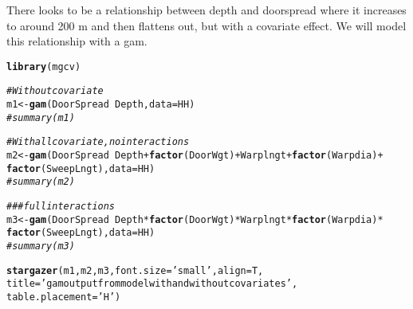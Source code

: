 \documentclass[12pt]{article}\usepackage[]{graphicx}\usepackage[]{color}
\makeatletter
\newcommand{\hlstr}[1]{\textcolor[rgb]{0.192,0.494,0.8}{#1}}%
\newcommand{\hlcom}[1]{\textcolor[rgb]{0.678,0.584,0.686}{\textit{#1}}}%
\newcommand{\hlopt}[1]{\textcolor[rgb]{0,0,0}{#1}}%
\newcommand{\hlstd}[1]{\textcolor[rgb]{0.345,0.345,0.345}{#1}}%
\newcommand{\hlkwb}[1]{\textcolor[rgb]{0.69,0.353,0.396}{#1}}%
\newcommand{\hlkwc}[1]{\textcolor[rgb]{0.333,0.667,0.333}{#1}}%
\newcommand{\hlkwd}[1]{\textcolor[rgb]{0.737,0.353,0.396}{\textbf{#1}}}%
\newenvironment{kframe}{%
 \def\at@end@of@kframe{}%
 \ifinner\ifhmode%
  \def\at@end@of@kframe{\end{minipage}}%
  \begin{minipage}{\columnwidth}%
 \fi\fi%
 \def\FrameCommand##1{\hskip\@totalleftmargin \hskip-\fboxsep
 \colorbox{shadecolor}{##1}\hskip-\fboxsep
     \hskip-\linewidth \hskip-\@totalleftmargin \hskip\columnwidth}%
 \MakeFramed {\advance\hsize-\width
   \@totalleftmargin\z@ \linewidth\hsize
   \@setminipage}}%
 {\par\unskip\endMakeFramed%
 \at@end@of@kframe}
\makeatother
\begin{document}
There looks to be a relationship between depth and doorspread where it
increases to around 200 m and then flattens out, but with a covariate effect.
We will model this relationship with a gam. 

\begin{kframe}
\begin{alltt}
\hlkwd{library}\hlstd{(mgcv)}

\hlcom{# Without covariate}
\hlstd{m1} \hlkwb{<-} \hlkwd{gam}\hlstd{(DoorSpread} \hlopt{~} \hlstd{Depth,} \hlkwc{data} \hlstd{= HH)}
\hlcom{#summary(m1)}

\hlcom{# With all covariate, no interactions}
\hlstd{m2} \hlkwb{<-} \hlkwd{gam}\hlstd{(DoorSpread} \hlopt{~} \hlstd{Depth} \hlopt{+} \hlkwd{factor}\hlstd{(DoorWgt)} \hlopt{+} \hlstd{Warplngt} \hlopt{+} \hlkwd{factor}\hlstd{(Warpdia)} \hlopt{+}
          \hlkwd{factor}\hlstd{(SweepLngt),} \hlkwc{data} \hlstd{=   HH)}
\hlcom{#summary(m2)}

\hlcom{### full interactions}
\hlstd{m3} \hlkwb{<-} \hlkwd{gam}\hlstd{(DoorSpread} \hlopt{~} \hlstd{Depth} \hlopt{*} \hlkwd{factor}\hlstd{(DoorWgt)} \hlopt{*} \hlstd{Warplngt} \hlopt{*} \hlkwd{factor}\hlstd{(Warpdia)} \hlopt{*}
          \hlkwd{factor}\hlstd{(SweepLngt),} \hlkwc{data} \hlstd{=   HH)}
\hlcom{#summary(m3)}


\hlkwd{stargazer}\hlstd{(m1, m2, m3,} \hlkwc{font.size}  \hlstd{=} \hlstr{'small'}\hlstd{,} \hlkwc{align} \hlstd{= T,}
          \hlkwc{title} \hlstd{=} \hlstr{'gam output from model with and without covariates'}\hlstd{,}
          \hlkwc{table.placement} \hlstd{=} \hlstr{'H'}\hlstd{)}
\end{alltt}
\end{kframe}
\end{document}
